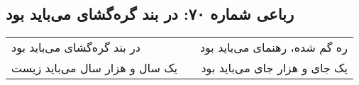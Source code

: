 \begin{center}
\section*{رباعی شماره ۷۰: در بند گره‌گشای می‌باید بود}
\label{sec:070}
\begin{longtable}{l p{0.5cm} r}
در بند گره‌گشای می‌باید بود
&&
ره گم شده، رهنمای می‌باید بود
\\
یک سال و هزار سال می‌باید زیست
&&
یک جای و هزار جای می‌باید بود
\\
\end{longtable}
\end{center}
